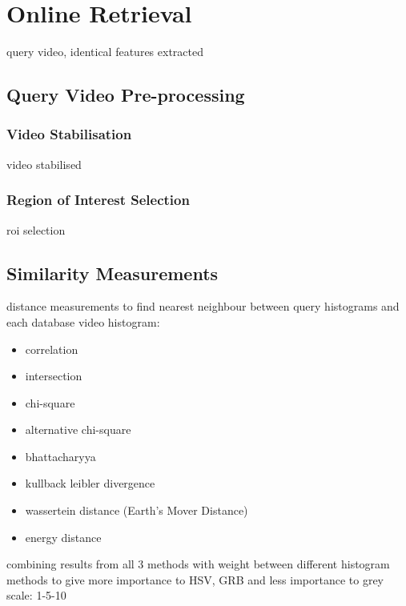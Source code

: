 \section{Online Retrieval}

query video, identical features extracted

\subsection{Query Video Pre-processing}

\subsubsection{Video Stabilisation}

video stabilised

\subsubsection{Region of Interest Selection}

roi selection

\subsection{Similarity Measurements}

distance measurements to find nearest neighbour between query histograms and each database video histogram:

\begin{itemize}
    \item correlation
    \item intersection
    \item chi-square
    \item alternative chi-square
    \item bhattacharyya
    \item kullback leibler divergence
    \item wassertein distance (Earth's Mover Distance)
    \item energy distance
\end{itemize}

combining results from all 3 methods with weight between different histogram methods to give more importance to HSV, GRB and less importance to grey scale: 1-5-10


